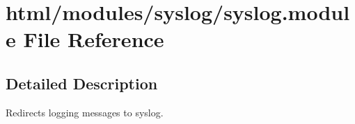 \hypertarget{syslog_8module}{
\section{html/modules/syslog/syslog.module File Reference}
\label{syslog_8module}
}


\subsection{Detailed Description}
Redirects logging messages to syslog. 